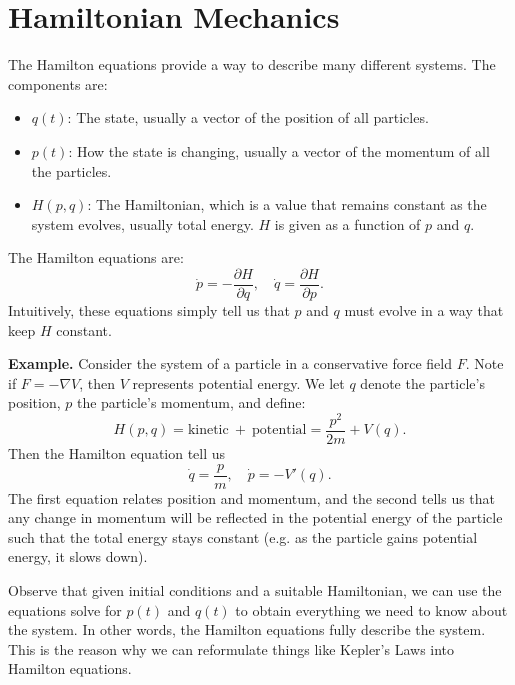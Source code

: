\section{Hamiltonian Mechanics}
The Hamilton equations provide a way to describe many different systems. The components are:
\begin{itemize}
    \item $q(t)$: The state, usually a vector of the position of all particles.
    \item $p(t)$: How the state is changing, usually a vector of the momentum of all the particles.
    \item $H(p, q)$: The Hamiltonian, which is a value that remains constant as the system evolves, usually total energy. $H$ is given as a function of $p$ and $q$.
\end{itemize}
The Hamilton equations are:
\[
    \dot{p} = - \frac{\partial H}{\partial q}, \quad \dot{q} = \frac{\partial H}{\partial p}.
\]
Intuitively, these equations simply tell us that $p$ and $q$ must evolve in a way that keep $H$ constant.

\hsep

\noindent
\textbf{Example.} Consider the system of a particle in a conservative force field $F$. Note if $F = -\nabla V$, then $V$ represents potential energy. We let $q$ denote the particle's position, $p$ the particle's momentum, and define:
\[
    H(p, q) = \text{kinetic} \ + \ \text{potential} = \frac{p^2}{2m} + V(q).
\]
Then the Hamilton equation tell us
\[
    \dot{q} = \frac{p}{m}, \quad \dot{p} = - V'(q).
\]
The first equation relates position and momentum, and the second tells us that any change in momentum will be reflected in the potential energy of the particle such that the total energy stays constant (e.g. as the particle gains potential energy, it slows down).

\hsep

Observe that given initial conditions and a suitable Hamiltonian, we can use the equations solve for $p(t)$ and $q(t)$ to obtain everything we need to know about the system. In other words, the Hamilton equations fully describe the system. This is the reason why we can reformulate things like Kepler's Laws into Hamilton equations.
